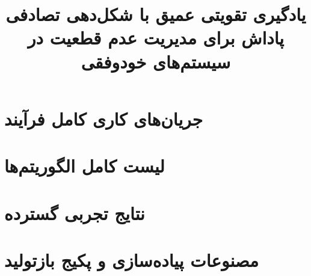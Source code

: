 \documentclass[oneside,openany,phd]{TMU-Thesis}
\title{یادگیری تقویتی عمیق با شکل‌دهی تصادفی پاداش برای مدیریت عدم قطعیت در سیستم‌های خودوفقی}
\begin{document}
\AutoPersianDigits
{}

\appendix
\chapter{جریان‌های کاری کامل فرآیند}
\newpage
\chapter{لیست کامل الگوریتم‌ها}
\newpage
\chapter{نتایج تجربی گسترده}
\newpage
\chapter{مصنوعات پیاده‌سازی و پکیج بازتولید}

\newpage



\ifstandalone


\fi
\end{document}
